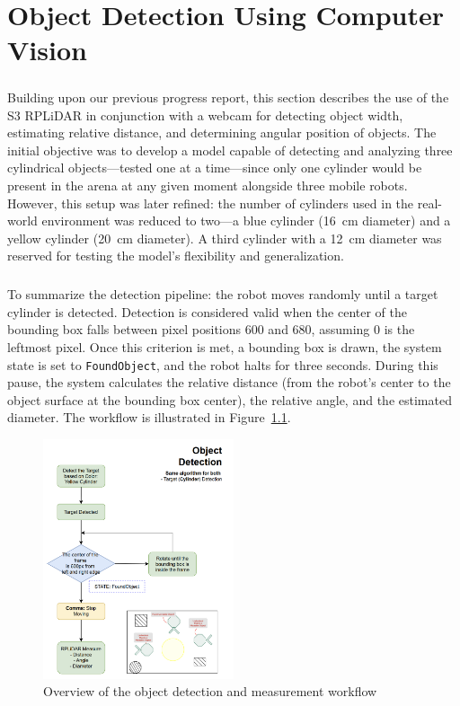 \chapter{Object Detection Using Computer Vision}

\paragraph*{}
Building upon our previous progress report, this section describes the use of the S3 RPLiDAR in conjunction with a webcam for detecting object width, estimating relative distance, and determining angular position of objects. The initial objective was to develop a model capable of detecting and analyzing three cylindrical objects—tested one at a time—since only one cylinder would be present in the arena at any given moment alongside three mobile robots. However, this setup was later refined: the number of cylinders used in the real-world environment was reduced to two—a blue cylinder (16~cm diameter) and a yellow cylinder (20~cm diameter). A third cylinder with a 12~cm diameter was reserved for testing the model's flexibility and generalization.

\paragraph*{}
To summarize the detection pipeline: the robot moves randomly until a target cylinder is detected. Detection is considered valid when the center of the bounding box falls between pixel positions 600 and 680, assuming 0 is the leftmost pixel. Once this criterion is met, a bounding box is drawn, the system state is set to \texttt{FoundObject}, and the robot halts for three seconds. During this pause, the system calculates the relative distance (from the robot’s center to the object surface at the bounding box center), the relative angle, and the estimated diameter. The workflow is illustrated in Figure~\ref{fig:workflow}.

\begin{figure}[H]
    \centering
    \includegraphics[width=0.5\textwidth]{assets/images/object_detection/fig1.png}
    \caption{Overview of the object detection and measurement workflow}
    \label{fig:workflow}
\end{figure}

